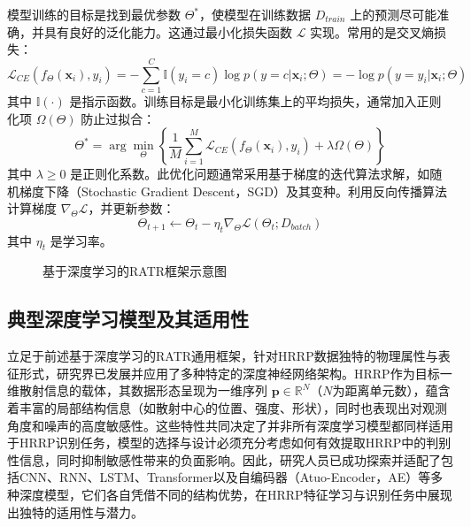 模型训练的目标是找到最优参数 $\Theta^*$，使模型在训练数据 $D_{train}$ 上的预测尽可能准确，并具有良好的泛化能力。这通过最小化损失函数 $\mathcal{L}$ 实现。常用的是交叉熵损失：
\begin{equation}
    \mathcal{L}_{CE}(f_\Theta(\mathbf{x}_i), y_i) = -\sum_{c=1}^{C} \mathbb{I}(y_i=c) \log p(y=c|\mathbf{x}_i; \Theta) = -\log p(y=y_i|\mathbf{x}_i; \Theta)
    \label{eq:cross_entropy_loss}
\end{equation}
其中 $\mathbb{I}(\cdot)$ 是指示函数。训练目标是最小化训练集上的平均损失，通常加入正则化项 $\Omega(\Theta)$ 防止过拟合：
\begin{equation}
    \Theta^* = \arg\min_{\Theta} \left\{ \frac{1}{M} \sum_{i=1}^{M} \mathcal{L}_{CE}(f_\Theta(\mathbf{x}_i), y_i) + \lambda \Omega(\Theta) \right\}
    \label{eq:optimization_objective}
\end{equation}
其中 $\lambda \ge 0$ 是正则化系数。此优化问题通常采用基于梯度的迭代算法求解，如随机梯度下降（Stochastic Gradient Descent，SGD）及其变种。利用反向传播算法计算梯度 $\nabla_\Theta \mathcal{L}$，并更新参数：
\begin{equation}
    \Theta_{t+1} \leftarrow \Theta_t - \eta_t \nabla_\Theta \mathcal{L}(\Theta_t; D_{batch})
    \label{eq:sgd_update}
\end{equation}
其中 $\eta_t$ 是学习率。

\begin{figure}[h!]
    \centering
    \caption{基于深度学习的RATR框架示意图}
    \label{fig:深度学习_framework}
\end{figure}

\subsection{典型深度学习模型及其适用性}
\label{subsec:typical_深度学习_models}

立足于前述基于深度学习的RATR通用框架，针对HRRP数据独特的物理属性与表征形式，研究界已发展并应用了多种特定的深度神经网络架构。HRRP作为目标一维散射信息的载体，其数据形态呈现为一维序列 $\mathbf{p} \in \mathbb{R}^N$（$N$为距离单元数），蕴含着丰富的局部结构信息（如散射中心的位置、强度、形状），同时也表现出对观测角度和噪声的高度敏感性。这些特性共同决定了并非所有深度学习模型都同样适用于HRRP识别任务，模型的选择与设计必须充分考虑如何有效提取HRRP中的判别性信息，同时抑制敏感性带来的负面影响。因此，研究人员已成功探索并适配了包括CNN、RNN、LSTM、Transformer以及自编码器（Atuo-Encoder，AE）等多种深度模型，它们各自凭借不同的结构优势，在HRRP特征学习与识别任务中展现出独特的适用性与潜力。

